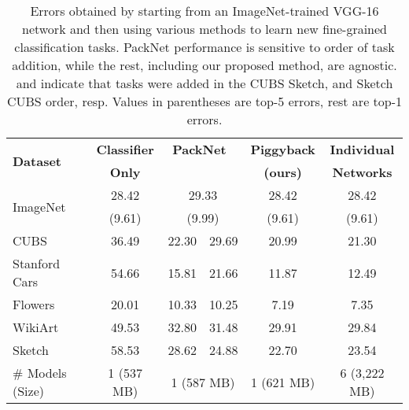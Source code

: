 \documentclass{llncs}
\begin{document}
\begin{table*}[th!]
  \centering
  \begin{tabular}{l||c|c|c|c|c}
    \hline
    \multirow{2}{*}{\bf Dataset} & {\bf Classifier} & \multicolumn{2}{c|}{\bf PackNet~\cite{mallya2017packnet}} & {\bf Piggyback} & {\bf Individual} \\
    & {\bf Only} &  &  & {\bf (ours)}& {\bf Networks} \\\hline\hline
    \multirow{2}{*}{ImageNet} & 28.42 & \multicolumn{2}{c|}{29.33} & 28.42 & 28.42 \\
    & (9.61) & \multicolumn{2}{c|}{(9.99)} & (9.61) & (9.61) \\\hline
    CUBS & 36.49 & 22.30 & 29.69 & 20.99 & 21.30 \\\hline
    Stanford Cars & 54.66 & 15.81 & 21.66 & 11.87 & 12.49 \\\hline
    Flowers & 20.01 & 10.33 & 10.25 & 7.19 & 7.35 \\\hline
    WikiArt & 49.53 & 32.80 & 31.48 & 29.91 & 29.84 \\\hline
    Sketch & 58.53 & 28.62 & 24.88 & 22.70 & 23.54 \\\hline\hline
    \# Models (Size) & 1 (537 MB) & \multicolumn{2}{c|}{1 (587 MB)} & 1 (621 MB) & 6 (3,222 MB) \\\hline
  \end{tabular}
  \caption{Errors obtained by starting from an ImageNet-trained VGG-16 network and then using various methods to learn new fine-grained classification tasks. PackNet performance is sensitive to order of task addition, while the rest, including our proposed method, are agnostic.  and  indicate that tasks were added in the CUBS  Sketch, and Sketch  CUBS order, resp. 
  Values in parentheses are top-5 errors, rest are top-1 errors.}
  \label{table:results_piggyback}
\end{table*}
\end{document}
